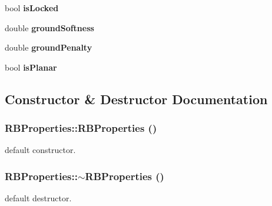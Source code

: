 \begin{DoxyCompactItemize}
\item 
\hypertarget{classCartWheel_1_1Physics_1_1RBProperties_ab4b956a85665b03873f1565ab6cf0cd8}{
bool {\bfseries isLocked}}
\label{classCartWheel_1_1Physics_1_1RBProperties_ab4b956a85665b03873f1565ab6cf0cd8}

\item 
\hypertarget{classCartWheel_1_1Physics_1_1RBProperties_a12532002732d8b23b596f5fae564a6d4}{
double {\bfseries groundSoftness}}
\label{classCartWheel_1_1Physics_1_1RBProperties_a12532002732d8b23b596f5fae564a6d4}

\item 
\hypertarget{classCartWheel_1_1Physics_1_1RBProperties_ac2d486dcab4123cb0af0b95deeeb1a9e}{
double {\bfseries groundPenalty}}
\label{classCartWheel_1_1Physics_1_1RBProperties_ac2d486dcab4123cb0af0b95deeeb1a9e}

\item 
\hypertarget{classCartWheel_1_1Physics_1_1RBProperties_a59b7b62856c2d780b363427666431af5}{
bool {\bfseries isPlanar}}
\label{classCartWheel_1_1Physics_1_1RBProperties_a59b7b62856c2d780b363427666431af5}

\end{DoxyCompactItemize}


\subsection{Constructor \& Destructor Documentation}
\hypertarget{classCartWheel_1_1Physics_1_1RBProperties_a53a77cc23fef32e8a87f84145f7276bf}{
\subsubsection[{RBProperties}]{\setlength{\rightskip}{0pt plus 5cm}RBProperties::RBProperties ()}}
\label{classCartWheel_1_1Physics_1_1RBProperties_a53a77cc23fef32e8a87f84145f7276bf}
default constructor. \hypertarget{classCartWheel_1_1Physics_1_1RBProperties_a129bad7fd6a18c27957897cbafa05e11}{
\subsubsection[{$\sim$RBProperties}]{\setlength{\rightskip}{0pt plus 5cm}RBProperties::$\sim$RBProperties ()}}
\label{classCartWheel_1_1Physics_1_1RBProperties_a129bad7fd6a18c27957897cbafa05e11}
default destructor. 

